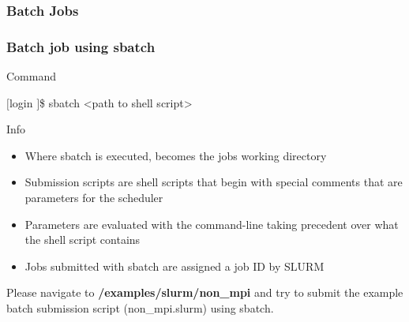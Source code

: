 \subsubsection{Batch Jobs}
\begin{frame}
  \frametitle{Batch job using sbatch}
  \begin{block}{Command}
		\begin{semiverbatim}$[$login \ctilde$]$\$ sbatch <path to shell script>\end{semiverbatim}	
  \end{block}
  \begin{block}{Info}
		\begin{itemize}
		\item Where sbatch is executed, becomes the jobs working directory
		\item Submission scripts are shell scripts that begin with special comments that are parameters for the scheduler
		\item Parameters are evaluated with the command-line taking precedent over what the shell script contains
                \item Jobs submitted with sbatch are assigned a job ID by SLURM
		\end{itemize}
	\end{block}
	  \btVFill
  \begin{center}Please navigate to \textbf{\ctilde/examples/slurm/non\_mpi} and try to submit the example batch submission script (non\_mpi.slurm)  using sbatch.\end{center}
\end{frame}


